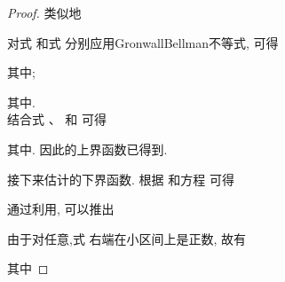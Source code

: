 \begin{proof}
        类似地
            \begin{comment}\label{equ:up3}
            \nonumber &\quad\| (u(t)-u_0)+(v(t)-v_0)\|\\
            \nonumber &=\|\int^t_0t[f(u(s))+f(v(s))]ds+(\xi+\zeta)t\|\\
            \nonumber &\leq\int^t_0\|f(u(s))+f(v(s))\|ds+\|\xi+\zeta\|t\\
            \nonumber &\leq l_2\int^t_0\|u(s)+v(s)\|ds+\|\xi+\zeta\|t\\
             &\leq l_2\int^t_0\|(u(s)-u_0)+(v(s)-v_0)\|ds+(\|\xi+\zeta\|+l_2\|u_0+v_0\|)t.
            \end{comment}
        对式  和式  分别应用GronwallBellman不等式, 可得
            \begin{comment}\label{equ:up4}
            \|(u(t)-u_0)-(v(t)-v_0)\|\leq\eta_1(\exp^{l_1t}-1),
            \end{comment}
       其中;
            \begin{comment}\label{equ:up5}
            \|(u(t)-u_0)+(v(t)-v_0)\|\leq\eta_2(\exp^{l_2t}-1),
            \end{comment}
       其中.\\
       结合式 、 和  可得
            \begin{comment}\label{equ:up6}
            \|(h(u)-h(u_0))-(h(v)-h(v_0))\|\leq\varphi(t,\xi,\zeta,u_0,v_0),
            \end{comment}
        其中.
        因此的上界函数已得到.

        接下来估计的下界函数. 根据 和方程  可得
            \begin{comment}\label{equ:low1}
            \nonumber &\quad\frac{d}{dt}[(u(t)-v(t))^\top(u(t)-v(t))]\\
            \nonumber &=2(u(t)-v(t))^\top(f(u(t))-f(v(t))+\xi-\zeta)\\
            \nonumber &=2(u(t)-v(t))^\top(f(u(t))-f(v(t)))+2(u(t)-v(t))^\top(\xi-\zeta)\\
            \nonumber &\geq 2\sigma(u(t)-v(t))^\top(u(t)-v(t))+2(u(t)-v(t))^\top(\xi-\zeta)\\
            \nonumber &\geq 2\sigma(u(t)-v(t))^\top(u(t)-v(t))-\sigma(u(t)-v(t))^\top(u(t)-v(t))-\frac{1}{\sigma}(\xi-\zeta)^\top(\xi-\zeta)\\
            &=\sigma(u(t)-v(t))^\top(u(t)-v(t))-\frac{1}{\sigma}(\xi-\zeta)^\top(\xi-\zeta).
            \end{comment}
        通过利用, 可以推出
        \begin{comment}\label{equ:low3}
        (u(t)-v(t))^\top(u(t)-v(t))\geq (u_0-v_0)^\top(u_0-v_0)e^{\sigma t}-\frac{(\xi-\zeta)^\top(\xi-\zeta)}{\sigma^2}(e^{\sigma t}-1).
        \end{comment}
        由于对任意,式  右端在小区间上是正数, 故有
        \begin{comment}\label{equ:low4}
        \| u(t)-v(t)\|\geq \psi(t,\xi,\zeta,u_0,v_0),
        \end{comment}
        其中



\end{proof}
